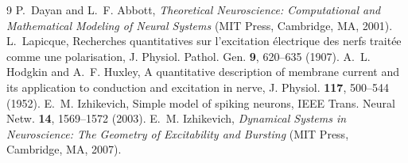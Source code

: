 \documentclass[10pt,a4paper,twocolumn]{article}
\begin{document}
\begin{thebibliography}{9}\small
\setlength{\itemsep}{1pt}
  P.~Dayan and L.~F. Abbott, \emph{Theoretical Neuroscience: Computational and
  Mathematical Modeling of Neural Systems} (MIT Press, Cambridge, MA, 2001).
  L.~Lapicque, Recherches quantitatives sur l'excitation électrique des nerfs
  traitée comme une polarisation, J. Physiol. Pathol. Gen. \textbf{9}, 620--635
  (1907).
  A.~L. Hodgkin and A.~F. Huxley, A quantitative description of membrane current and
  its application to conduction and excitation in nerve, J. Physiol. \textbf{117},
  500--544 (1952).
  E.~M. Izhikevich, Simple model of spiking neurons, IEEE Trans. Neural Netw.
  \textbf{14}, 1569--1572 (2003).
  E.~M. Izhikevich, \emph{Dynamical Systems in Neuroscience: The Geometry of
  Excitability and Bursting} (MIT Press, Cambridge, MA, 2007).
\end{thebibliography}
\end{document}
